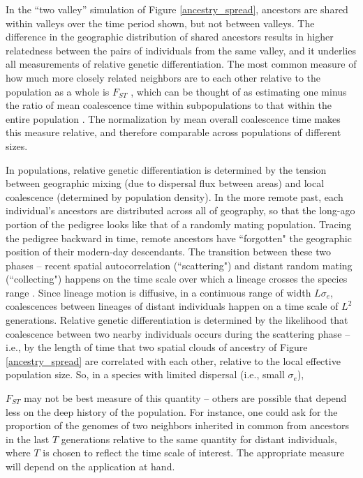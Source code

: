 \documentclass{ar-1col}
\newcommand{\g}[1]{{\color{blue}{#1}}}
\begin{document}
In the ``two valley'' simulation of Figure \ref{ancestry_spread},
ancestors are shared within valleys over the time period shown,
but not between valleys.
The difference in the geographic distribution of shared ancestors 
results in higher relatedness between the pairs of individuals 
from the same valley, 
and it underlies all measurements of relative genetic differentiation.
The most common measure of
how much more closely related neighbors are to each other relative to the population as a whole
is $F_{ST}$ \citep{Wright1951},
which can be thought of as estimating
one minus the ratio of mean coalescence time within subpopulations
to that within the entire population \citep{slatkin_1991inbreeding}.
The normalization by mean overall coalescence time 
makes this measure relative, 
and therefore comparable across populations of different sizes.

In \g{stationary} populations,
relative genetic differentiation is determined by the tension between 
geographic mixing (due to dispersal flux between areas)
and local coalescence (determined by population density).
In the more remote past, each individual's ancestors are distributed across
all of geography,
so that the long-ago portion of the pedigree looks like that of a randomly mating population.
Tracing the pedigree backward in time, 
remote ancestors have ``forgotten" the geographic position of their 
modern-day descendants.
The transition between these two phases -- recent spatial autocorrelation 
(``scattering") and distant random mating (``collecting")
\citep{Wakeley1999,wilkins2004separationoftimescales}
happens on the time scale over which a lineage crosses the species range \citep{Wakeley1999}.
Since lineage motion is diffusive, in a continuous range of width $L \sigma_e$,
coalescences between lineages of distant individuals happen on a time scale of $L^2$ generations.
Relative genetic differentiation
is determined by the likelihood that coalescence between two nearby individuals
occurs during the scattering phase
-- i.e., by the length of time that two spatial clouds of ancestry of Figure \ref{ancestry_spread}
are correlated with each other,
relative to the local effective population size.
So, in a species with limited dispersal 
(i.e., small $\sigma_e$),

$F_{ST}$ may not be best measure of this quantity -- 
others are possible that depend less on the deep history of the population.
For instance,
one could ask for the proportion of the genomes of two neighbors 
inherited in common from ancestors in the last $T$ generations
relative to the same quantity for distant individuals,
where $T$ is chosen to reflect the time scale of interest.
The appropriate measure will depend on the application at hand.
\end{document}
